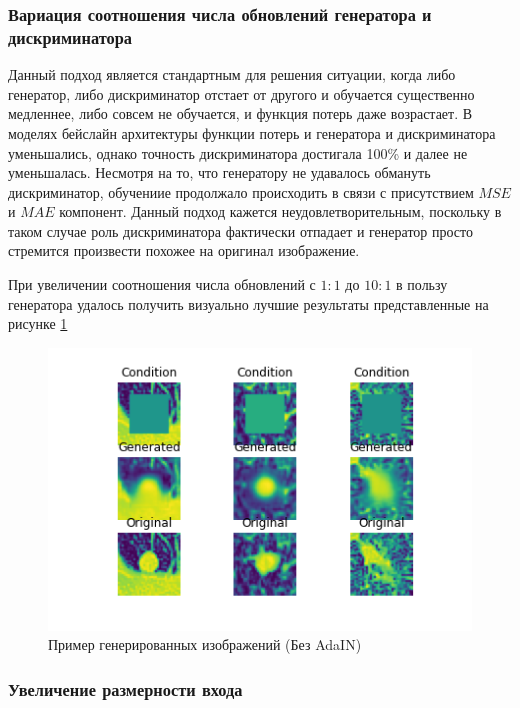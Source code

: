 \subsubsection{Вариация соотношения числа обновлений генератора и дискриминатора}

Данный подход является стандартным для решения ситуации, когда либо генератор, либо дискриминатор отстает от другого и обучается существенно медленнее, либо совсем не обучается, и функция потерь даже возрастает. В моделях бейслайн архитектуры функции потерь и генератора и дискриминатора уменьшались, однако точность дискриминатора достигала 100\% и далее не уменьшалась. Несмотря на то, что генератору не удавалось обмануть дискриминатор, обучениие продолжало происходить в связи с присутствием $MSE$ и $MAE$ компонент. Данный подход кажется неудовлетворительным, поскольку в таком случае роль дискриминатора фактически отпадает и генератор просто стремится произвести похожее на оригинал изображение.

При увеличении соотношения числа обновлений с $1:1$ до $10:1$ в пользу генератора удалось получить визуально лучшие результаты представленные на рисунке \ref{cgan-10wu-no-adain-baseline-loss}

\begin{figure}[!h]
\includegraphics[width=\linewidth]{images/gan-results/no-adain.png}
\caption{Пример генерированных изображений (Без AdaIN)}\label{cgan-10wu-no-adain-baseline-loss}
\centering
\end{figure}

\subsubsection{Увеличение размерности входа}

